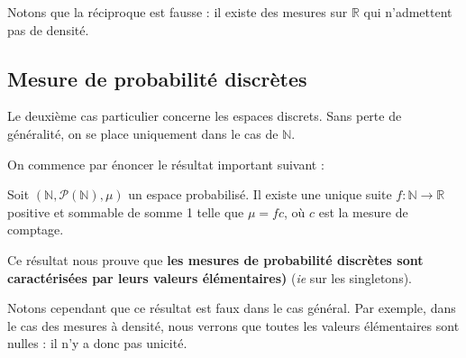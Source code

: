 \documentclass[../integ-proba.tex]{subfiles}
\begin{document}
            \begin{rem}
                Notons que la réciproque est fausse : il existe des mesures sur $\mathbb{R}$ qui n'admettent pas de densité.
            \end{rem}



        \subsection{Mesure de probabilité discrètes}
            Le deuxième cas particulier concerne les espaces discrets.
            Sans perte de généralité, on se place uniquement dans le cas de $\mathbb{N}$.

            On commence par énoncer le résultat important suivant :

            \begin{thm}
                Soit $\left(\mathbb{N}, \mathcal{P}(\mathbb{N}), \mu \right)$ un espace probabilisé.
                Il existe une unique suite $f:\mathbb{N} \rightarrow \mathbb{R}$ positive et sommable de somme 1 telle que $\mu = f c$, où $c$ est la mesure de comptage.
            \end{thm}

            \begin{rem}
                Ce résultat nous prouve que \textbf{les mesures de probabilité discrètes sont caractérisées par leurs valeurs élémentaires)} (\textit{ie} sur les singletons).

                Notons cependant que ce résultat est faux dans le cas général.
                Par exemple, dans le cas des mesures à densité, nous verrons que toutes les valeurs élémentaires sont nulles : il n'y a donc pas unicité.
            \end{rem}

\end{document}
